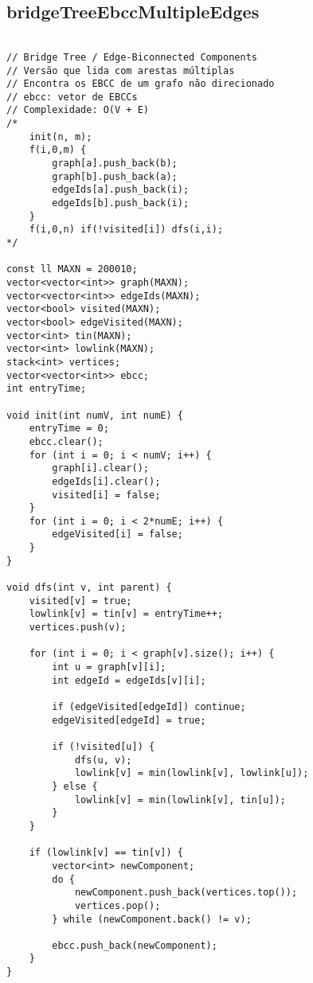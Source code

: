 \documentclass[landscape,twocolumn,10pt,a4paper]{article}
\begin{document}
\subsection{bridgeTreeEbccMultipleEdges}
\begin{verbatim}

// Bridge Tree / Edge-Biconnected Components
// Versão que lida com arestas múltiplas
// Encontra os EBCC de um grafo não direcionado
// ebcc: vetor de EBCCs
// Complexidade: O(V + E)
/*
    init(n, m);
    f(i,0,m) {
        graph[a].push_back(b);
        graph[b].push_back(a);
        edgeIds[a].push_back(i);
        edgeIds[b].push_back(i);
    }
    f(i,0,n) if(!visited[i]) dfs(i,i);
*/

const ll MAXN = 200010;
vector<vector<int>> graph(MAXN);
vector<vector<int>> edgeIds(MAXN);
vector<bool> visited(MAXN);
vector<bool> edgeVisited(MAXN);
vector<int> tin(MAXN);
vector<int> lowlink(MAXN);
stack<int> vertices;
vector<vector<int>> ebcc;
int entryTime;

void init(int numV, int numE) {
    entryTime = 0;
    ebcc.clear();
    for (int i = 0; i < numV; i++) {
        graph[i].clear();
        edgeIds[i].clear();
        visited[i] = false;
    }
    for (int i = 0; i < 2*numE; i++) {
        edgeVisited[i] = false;
    }
}

void dfs(int v, int parent) {
    visited[v] = true;
    lowlink[v] = tin[v] = entryTime++;
    vertices.push(v); 

    for (int i = 0; i < graph[v].size(); i++) {
        int u = graph[v][i];
        int edgeId = edgeIds[v][i];

        if (edgeVisited[edgeId]) continue;
        edgeVisited[edgeId] = true;

        if (!visited[u]) {
            dfs(u, v);
            lowlink[v] = min(lowlink[v], lowlink[u]);
        } else {
            lowlink[v] = min(lowlink[v], tin[u]);
        }
    }

    if (lowlink[v] == tin[v]) {
        vector<int> newComponent;
        do {
            newComponent.push_back(vertices.top());
            vertices.pop();
        } while (newComponent.back() != v);

        ebcc.push_back(newComponent);
    }
}


\end{verbatim}
\end{document}
